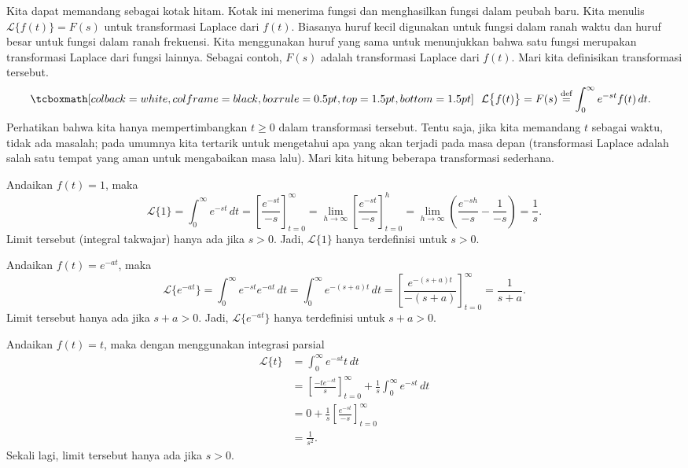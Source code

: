 Kita dapat memandang \emph{} sebagai kotak hitam.  Kotak ini
menerima fungsi dan menghasilkan fungsi dalam peubah baru.  Kita menulis
$\mathcal{L} \bigl\{ f(t) \bigr\} = F(s)$ untuk transformasi Laplace dari $f(t)$.
Biasanya huruf kecil digunakan untuk
fungsi dalam ranah waktu dan huruf besar untuk fungsi dalam
ranah frekuensi.  Kita menggunakan huruf yang sama untuk menunjukkan bahwa satu fungsi
merupakan transformasi Laplace dari fungsi lainnya.  Sebagai contoh, $F(s)$ adalah transformasi Laplace
dari $f(t)$.  Mari kita definisikan transformasi tersebut.
\begin{equation*}
\mybxbg{~~
\mathcal{L} \bigl\{ f(t) \bigr\} =
F(s) \overset{\text{def}}{=} \int_0^\infty e^{-st} f(t) \, dt .
~~}
\end{equation*}
Perhatikan bahwa kita hanya mempertimbangkan $t \geq 0$ dalam transformasi tersebut.  Tentu saja,
jika kita memandang $t$ sebagai waktu, tidak ada masalah; pada umumnya kita tertarik untuk
mengetahui apa yang akan terjadi pada masa depan
(transformasi Laplace adalah salah satu tempat
yang aman untuk mengabaikan masa lalu).
Mari kita hitung beberapa
transformasi sederhana.

\begin{example}
Andaikan $f(t) = 1$, maka
\begin{equation*}
\mathcal{L} \{1\} = \int_0^\infty e^{-st} \, dt
=
\left[ \frac{e^{-st}}{-s} \right]_{t=0}^\infty
=
\lim_{h\to\infty}
\left[ \frac{e^{-st}}{-s} \right]_{t=0}^h
=
\lim_{h\to\infty}
\left( \frac{e^{-sh}}{-s} - \frac{1}{-s} \right)
= \frac{1}{s} .
\end{equation*}
Limit tersebut (integral takwajar) hanya ada jika $s > 0$.  Jadi, 
$\mathcal{L} \{1\}$ hanya terdefinisi untuk $s > 0$.
\end{example}

\begin{example}
Andaikan $f(t) = e^{-at}$, maka
\begin{equation*}
\mathcal{L} \bigl\{e^{-at}\bigr\}
= \int_0^\infty e^{-st} e^{-at} \, dt
= \int_0^\infty e^{-(s+a)t} \, dt
=
\left[ \frac{e^{-(s+a)t}}{-(s+a)} \right]_{t=0}^\infty
= \frac{1}{s+a} .
\end{equation*}
Limit tersebut hanya ada jika $s+a > 0$.  Jadi, 
$\mathcal{L} \bigl\{e^{-at}\bigr\}$ hanya terdefinisi untuk $s+a > 0$.
\end{example}

\begin{example}
Andaikan $f(t) = t$, maka dengan menggunakan integrasi parsial
\begin{equation*}
\begin{split}
\mathcal{L} \{t\}
& = \int_0^\infty e^{-st} t \, dt \\
& =
\left[ \frac{-te^{-st}}{s} \right]_{t=0}^\infty
+
\frac{1}{s}
\int_0^\infty e^{-st} \,dt \\
& =
0
+
\frac{1}{s}
\left[ \frac{e^{-st}}{-s} \right]_{t=0}^\infty \\
& =
\frac{1}{s^2} .
\end{split}
\end{equation*}
Sekali lagi, limit tersebut hanya ada jika $s > 0$.
\end{example}

